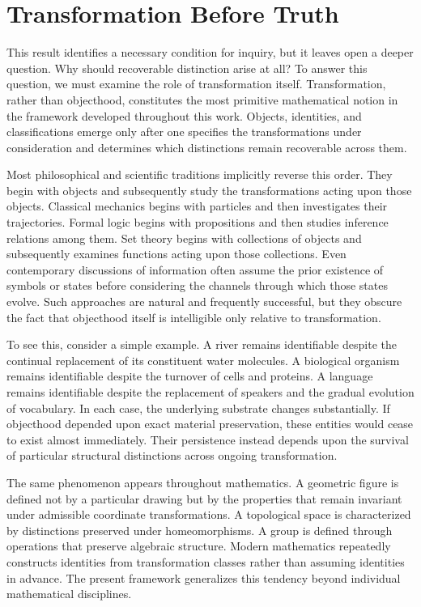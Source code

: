 \documentclass[12pt,oneside]{article}
\theoremstyle{definition}
\begin{document}
\section{Transformation Before Truth}

This result identifies a necessary condition for inquiry, but it leaves open a deeper question. Why should recoverable distinction arise at all? To answer this question, we must examine the role of transformation itself. Transformation, rather than objecthood, constitutes the most primitive mathematical notion in the framework developed throughout this work. Objects, identities, and classifications emerge only after one specifies the transformations under consideration and determines which distinctions remain recoverable across them.

Most philosophical and scientific traditions implicitly reverse this order. They begin with objects and subsequently study the transformations acting upon those objects. Classical mechanics begins with particles and then investigates their trajectories. Formal logic begins with propositions and then studies inference relations among them. Set theory begins with collections of objects and subsequently examines functions acting upon those collections. Even contemporary discussions of information often assume the prior existence of symbols or states before considering the channels through which those states evolve. Such approaches are natural and frequently successful, but they obscure the fact that objecthood itself is intelligible only relative to transformation.

To see this, consider a simple example. A river remains identifiable despite the continual replacement of its constituent water molecules. A biological organism remains identifiable despite the turnover of cells and proteins. A language remains identifiable despite the replacement of speakers and the gradual evolution of vocabulary. In each case, the underlying substrate changes substantially. If objecthood depended upon exact material preservation, these entities would cease to exist almost immediately. Their persistence instead depends upon the survival of particular structural distinctions across ongoing transformation.

The same phenomenon appears throughout mathematics. A geometric figure is defined not by a particular drawing but by the properties that remain invariant under admissible coordinate transformations. A topological space is characterized by distinctions preserved under homeomorphisms. A group is defined through operations that preserve algebraic structure. Modern mathematics repeatedly constructs identities from transformation classes rather than assuming identities in advance. The present framework generalizes this tendency beyond individual mathematical disciplines.
\end{document}
